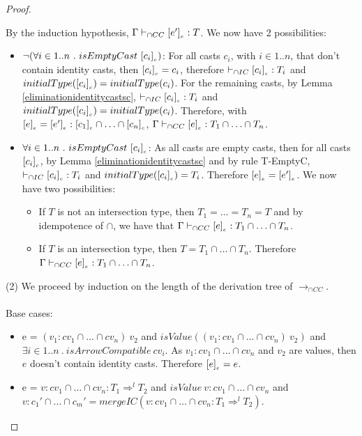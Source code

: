 \documentclass[a4paper]{article}
\begin{document}
\begin{proof}
\begin{itemize}
    By the induction hypothesis, $\Gamma \vdash_{\cap CC} [e']_{_e} : T$.
    We now have 2 possibilities:
    \begin{itemize}
        \item $\neg(\forall i \in 1..n\ .\ isEmptyCast\ \erasec{c_i})$:
        For all casts $c_i$, with $i \in 1..n$, that don't contain identity casts, then $[c_i]_{_c} = c_i$, therefore $\vdash_{\cap IC} [c_i]_{_c} : T_i$ and $initialType([c_i]_{_c}) = initialType(c_i)$.
        For the remaining casts, by Lemma \ref{eliminationidentitycastsc}, $\vdash_{\cap IC} [c_i]_{_c} : T_i$ and $initialType([c_i]_{_c}) = initialType(c_i)$.
        Therefore, with $[e]_{_e} = [e']_{_e} : [c_1]_{_c} \cap \ldots \cap [c_n]_{_c}$, $\Gamma \vdash_{\cap CC} [e]_{_e} : T_1 \cap \ldots \cap T_n$.
        \item $\forall i \in 1..n\ .\ isEmptyCast\ \erasec{c_i}$:
        As all casts are empty casts, then for all casts $[c_i]_{_c}$, by Lemma \ref{eliminationidentitycastsc} and by rule T-EmptyC, $\vdash_{\cap IC} [c_i]_{_c} : T_i$ and $initialType([c_i]_{_c}) = T_i$.
        Therefore $[e]_{_e} = [e']_{_e}$.
        We now have two possibilities:
        \begin{itemize}
            \item If $T$ is not an intersection type, then $T_1 = \ldots = T_n = T$ and by idempotence of $\cap$, we have that $\Gamma \vdash_{\cap CC} [e]_{_e} : T_1 \cap \ldots \cap T_n$.
            \item If $T$ is an intersection type, then $T = T_1 \cap \ldots \cap T_n$. Therefore $\Gamma \vdash_{\cap CC} [e]_{_e} : T_1 \cap \ldots \cap T_n$.
        \end{itemize}
    \end{itemize}
\end{itemize}
(2) We proceed by induction on the length of the derivation tree of $\longrightarrow_{\cap CC}$.\\\\
Base cases:
\begin{itemize}
    \item e = $(v_1 : cv_1 \cap \ldots \cap cv_n)\ v_2$ and $isValue((v_1 : cv_1 \cap \ldots \cap cv_n)\ v_2)$ and $\exists i \in 1..n\ .\ isArrowCompatible\ cv_i$.
    As $v_1 : cv_1 \cap \ldots \cap cv_n$ and $v_2$ are values, then $e$ doesn't contain identity casts.
    Therefore $[e]_{_e} = e$.
    \item e = $v : cv_1 \cap \ldots \cap cv_n : T_1 \Rightarrow^l T_2$ and $isValue\ v : cv_1 \cap \ldots \cap cv_n$ and $v : c_1' \cap \ldots \cap c_m' = mergeIC (v : cv_1 \cap \ldots \cap cv_n : T_1 \Rightarrow^l T_2)$.

\end{itemize}
\end{proof}
\end{document}
